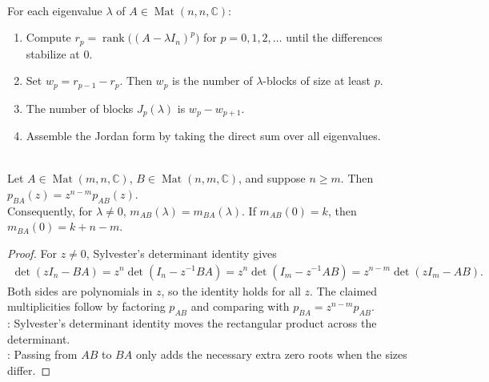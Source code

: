 \begin{method} \label{meth:jordan-form-from-rank-drops} \\
For each eigenvalue $\lambda$ of $A\in\operatorname{Mat}(n,n,\mathbb{C})$:
\begin{enumerate}[label=(\roman*)]
\setlength{\itemsep}{0pt}
\item Compute $r_p=\operatorname{rank}\bigl((A-\lambda I_n)^p\bigr)$ for $p=0,1,2,\ldots$ until the differences stabilize at $0$.
\item Set $w_p=r_{p-1}-r_p$. Then $w_p$ is the number of $\lambda$-blocks of size at least $p$.
\item The number of blocks $J_p(\lambda)$ is $w_p-w_{p+1}$.
\item Assemble the Jordan form by taking the direct sum over all eigenvalues.
\end{enumerate}
\end{method}

\begin{theorem} \label{thm:ab-ba-nonzero-eigenvalues} \\
Let $A\in\operatorname{Mat}(m,n,\mathbb{C})$, $B\in\operatorname{Mat}(n,m,\mathbb{C})$, and suppose $n\geq m$. Then $p_{BA}(z)=z^{n-m}p_{AB}(z)$.\\
Consequently, for $\lambda\neq0$, $m_{AB}(\lambda)=m_{BA}(\lambda)$. If $m_{AB}(0)=k$, then $m_{BA}(0)=k+n-m$.
\begin{proof}
For $z\neq0$, Sylvester's determinant identity gives
\begin{align}
\det(zI_n-BA) =z^n\det(I_n-z^{-1}BA) =z^n\det(I_m-z^{-1}AB) =z^{n-m}\det(zI_m-AB).
\nonumber
\end{align}
Both sides are polynomials in $z$, so the identity holds for all $z$. The claimed multiplicities follow by factoring $p_{AB}$ and comparing with $p_{BA}=z^{n-m}p_{AB}$.\\
: Sylvester's determinant identity moves the rectangular product across the determinant.\\
: Passing from $AB$ to $BA$ only adds the necessary extra zero roots when the sizes differ.
\end{proof}
\end{theorem}

